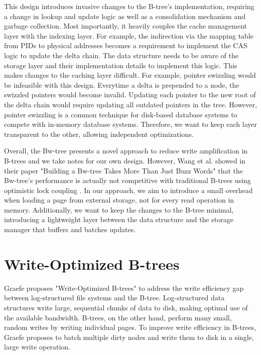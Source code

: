 This design introduces invasive changes to the B-tree's implementation, requiring a change in lookup and update logic as well as a consolidation mechanism and garbage collection. 
Most importantly, it heavily couples the cache management layer with the indexing layer.
For example, the indirection via the mapping table from \ac{PID}s to physical addresses becomes a requirement to implement the \ac{CAS} logic to update the delta chain.
The data structure needs to be aware of the storage layer and their implementation details to implement this logic.
This makes changes to the caching layer difficult. 
For example, pointer swizzling \cite{graefe2014memory} would be infeasible with this design. 
Everytime a delta is prepended to a node, the swizzled pointers would become invalid.
Updating each pointer to the new root of the delta chain would require updating all outdated pointers in the tree.
However, pointer swizzling is a common technique for disk-based database systems \cite{leis2018leanstore} to compete with in-memory database systems.
Therefore, we want to keep each layer transparent to the other, allowing independent optimizations.

Overall, the Bw-tree presents a novel approach to reduce write amplification in B-trees and we take notes for our own design.
However, Wang et al. showed in their paper "Building a Bw-tree Takes More Than Just Buzz Words" \cite{wang2018bwtree} that the Bw-tree's performance is actually not competitive with traditional B-trees using optimistic lock coupling \cite{leis2019optimistic}.
In our approach, we aim to introduce a small overhead when loading a page from external storage, not for every read operation in memory.
Additionally, we want to keep the changes to the B-tree minimal, introducing a lightweight layer between the data structure and the storage manager that buffers and batches updates.   

\section{Write-Optimized B-trees}
\label{sec:related-work-wo-btrees}
Graefe proposes "Write-Optimized B-trees" \cite{graefe2004write} to address the write efficiency gap between log-structured file systems and the B-tree.
Log-structured data structures write large, sequential chunks of data to disk, making optimal use of the available bandwidth.
B-trees, on the other hand, perform many small, random writes by writing individual pages.
To improve write efficiency in B-trees, Graefe proposes to batch multiple dirty nodes and write them to disk in a single, large write operation.

